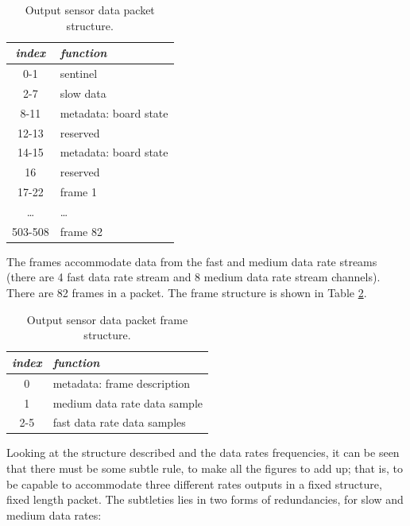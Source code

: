 \documentclass{article} \usepackage{times}
\begin{document}
\begin{table}[htbp]
  \caption{Output sensor data packet structure.}
  \label{tab:data_packet_structure}
  \begin{center}
    \begin{tabular}{|c|l|}\hline
      \textbf{\textit{index}} & \textbf{\textit{function}}\\\hline
      0-1 & sentinel\\\hline
      2-7 & slow data\\\hline
      8-11 & metadata: board state\\\hline
      12-13 & reserved\\\hline
      14-15 & metadata: board state\\\hline
      16 & reserved\\\hline
      17-22 & frame 1\\\hline
      \ldots & \ldots\\\hline
      503-508 & frame 82\\\hline
    \end{tabular}
  \end{center}
\end{table}

The frames accommodate data from the fast and medium data rate streams
(there are 4 fast data rate stream and 8 medium data rate stream
channels).  There are 82 frames in a packet.  The frame structure is
shown in Table \ref{tab:frame_structure}.

\begin{table}[htbp]
  \caption{Output sensor data packet frame structure.}
  \label{tab:frame_structure}
  \begin{center}
    \begin{tabular}{|c|l|}\hline
      \textbf{\textit{index}} & \textbf{\textit{function}}\\\hline
      0 & metadata: frame description\\\hline
      1 & medium data rate data sample\\\hline
      2-5 & fast data rate data samples\\\hline
    \end{tabular}
  \end{center}
\end{table}

Looking at the structure described and the data rates frequencies, it
can be seen that there must be some subtle rule, to make all the
figures to add up; that is, to be capable to accommodate three
different rates outputs in a fixed structure, fixed length packet.
The subtleties lies in two forms of redundancies, for slow and medium
data rates:
\end{document}
